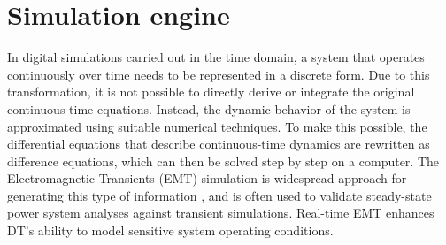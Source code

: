 \section{Simulation engine}\label{sec:ch3/sec5}

In digital simulations carried out in the time domain, a system that operates continuously over time needs to be represented in a discrete form. Due to this transformation, it is not possible to directly derive or integrate the original continuous-time equations. Instead, the dynamic behavior of the system is approximated using suitable numerical techniques. To make this possible, the differential equations that describe continuous-time dynamics are rewritten as difference equations, which can then be solved step by step on a computer. The Electromagnetic Transients (EMT) simulation is widespread approach for generating this type of information \autocite{dommel1992emtp,4073845,osti_78239,277712,56581}, and is often used to validate steady-state power system analyses against transient simulations. Real-time EMT enhances DT's ability to model sensitive system operating conditions. 




